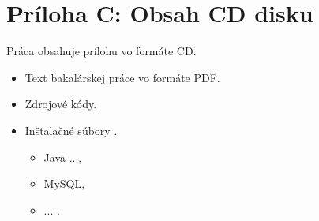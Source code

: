 \clearpage

\section*{\textbf{Príloha C}: Obsah CD disku}

Práca obsahuje prílohu vo formáte CD.

\begin{itemize}
    \item Text bakalárskej práce vo formáte PDF.
    \item Zdrojové kódy.
    \item Inštalačné súbory .\begin{itemize}
        \item Java ...,
        \item MySQL,
        \item ... .
    \end{itemize}
\end{itemize}
\clearpage

